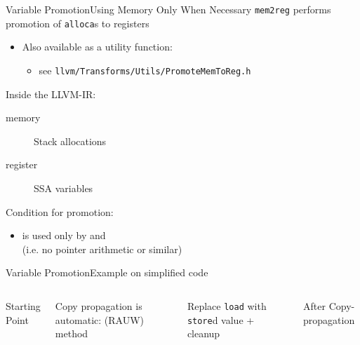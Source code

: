 \begin{frame}{Variable Promotion}{Using Memory Only When Necessary}
\texttt{mem2reg} performs \alert{promotion} of \texttt{alloca}s to registers
\begin{itemize}
\item Also available as a utility function: \\
\begin{itemize}
\item see \texttt{llvm/Transforms/Utils/PromoteMemToReg.h}
\end{itemize}
\end{itemize}

\vfill
Inside the LLVM-IR:
\begin{description}
\item[memory] Stack allocations \\
\item[register] SSA variables \\
\end{description}

\vfill
Condition for promotion:
\begin{itemize}
\item {} is used only by  and
      \\(i.e. no pointer arithmetic or similar)
\end{itemize}
\end{frame}


\begin{frame}{Variable Promotion}{Example on simplified code}
\begin{columns}[t]
\begin{block}{Starting Point}
\end{block}

Copy propagation is automatic:  (RAUW) method

\begin{block}{Replace \texttt{load} with \texttt{store}d value + cleanup}
\end{block}

\begin{block}{After Copy-propagation}
\end{block}

\end{columns}
\end{frame}


